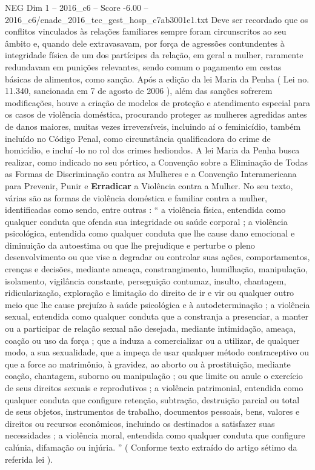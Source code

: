 \begin{textsample}{NEG Dim 1 – 2016\_c6 – Score -6.00 – 2016\_c6/enade\_2016\_tec\_gest\_hosp\_c7ab3001e1.txt}
Deve ser recordado que os conflitos vinculados às relações familiares sempre foram circunscritos ao seu âmbito e, quando dele extravasavam, por força de agressões contundentes à integridade física de um dos partícipes da relação, em geral a mulher, raramente redundavam em punições relevantes, sendo comum o pagamento em cestas básicas de alimentos, como sanção.
Após a edição da lei Maria da Penha ( Lei no. 11.340, sancionada em 7 de agosto de 2006 ), além das sanções sofrerem modificações, houve a criação de modelos de proteção e atendimento especial para os casos de violência doméstica, procurando proteger as mulheres agredidas antes de danos maiores, muitas vezes irreversíveis, incluindo aí o feminicídio, também incluído no Código Penal, como circunstância qualificadora do crime de homicídio, e incluí -lo no rol dos crimes hediondos.
A lei Maria da Penha busca realizar, como indicado no seu pórtico, a Convenção sobre a Eliminação de Todas as Formas de Discriminação contra as Mulheres e a Convenção Interamericana para Prevenir, Punir e \textbf{Erradicar} a Violência contra a Mulher.
No seu texto, várias são as formas de violência doméstica e familiar contra a mulher, identificadas como sendo, entre outras : “ a violência física, entendida como qualquer conduta que ofenda sua integridade ou saúde corporal ; a violência psicológica, entendida como qualquer conduta que lhe cause dano emocional e diminuição da autoestima ou que lhe prejudique e perturbe o pleno desenvolvimento ou que vise a degradar ou controlar suas ações, comportamentos, crenças e decisões, mediante ameaça, constrangimento, humilhação, manipulação, isolamento, vigilância constante, perseguição contumaz, insulto, chantagem, ridicularização, exploração e limitação do direito de ir e vir ou qualquer outro meio que lhe cause prejuízo à saúde psicológica e à autodeterminação ; a violência sexual, entendida como qualquer conduta que a constranja a presenciar, a manter ou a participar de relação sexual não desejada, mediante intimidação, ameaça, coação ou uso da força ; que a induza a comercializar ou a utilizar, de qualquer modo, a sua sexualidade, que a impeça de usar qualquer método contraceptivo ou que a force ao matrimônio, à gravidez, ao aborto ou à prostituição, mediante coação, chantagem, suborno ou manipulação ; ou que limite ou anule o exercício de seus direitos sexuais e reprodutivos ; a violência patrimonial, entendida como qualquer conduta que configure retenção, subtração, destruição parcial ou total de seus objetos, instrumentos de trabalho, documentos pessoais, bens, valores e direitos ou recursos econômicos, incluindo os destinados a satisfazer suas necessidades ; a violência moral, entendida como qualquer conduta que configure calúnia, difamação ou injúria. ” ( Conforme texto extraído do artigo sétimo da referida lei ).

\end{textsample}

